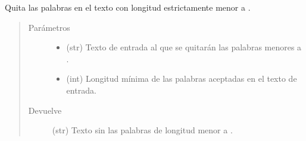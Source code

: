 \documentclass[letterpaper,10pt,openany,spanish]{sphinxmanual}
\begin{document}

\begin{fulllineitems}
\label{\detokenize{funciones/limpieza:limpieza.remover_palabras_cortas}}
Quita las palabras en el texto con longitud estrictamente menor a .
\begin{quote}\begin{description}
\item[{Parámetros}] \leavevmode\begin{itemize}
\item {} 
 \textendash{} (str) Texto de entrada al que se quitarán las palabras menores a .

\item {} 
 \textendash{} (int) Longitud mínima de las palabras aceptadas en el texto de entrada.

\end{itemize}

\item[{Devuelve}] \leavevmode
(str) Texto sin las palabras de longitud menor a .

\end{description}\end{quote}

\end{fulllineitems}

\end{document}
